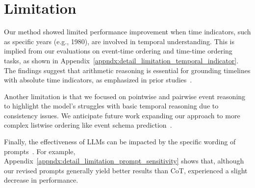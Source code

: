 \section{Limitation}

Our method showed limited performance improvement when time indicators, such as specific years (e.g., 1980), are involved in temporal understanding. This is implied from our evaluations on event-time ordering and time-time ordering tasks, as shown in Appendix~\ref{appndx:detail_limitation_temporal_indicator}. The findings suggest that arithmetic reasoning is essential for grounding timelines with absolute time indicators, as emphasized in prior studies~\cite{su2024timo,zhu2023question}. 

Another limitation is that we focused on pointwise and pairwise event reasoning to highlight the model's struggles with basic temporal reasoning due to consistency issues. We anticipate future work expanding our approach to more complex listwise ordering like event schema prediction~\cite{zhang-etal-2024-narrative}.

Finally, the effectiveness of LLMs can be impacted by the specific wording of prompts~\cite{jiang2020can}. For example, Appendix~\ref{appndx:detail_limitation_prompt_sensitivity} shows that, although our revised prompts generally yield better results than CoT, \ours experienced a slight decrease in performance.

